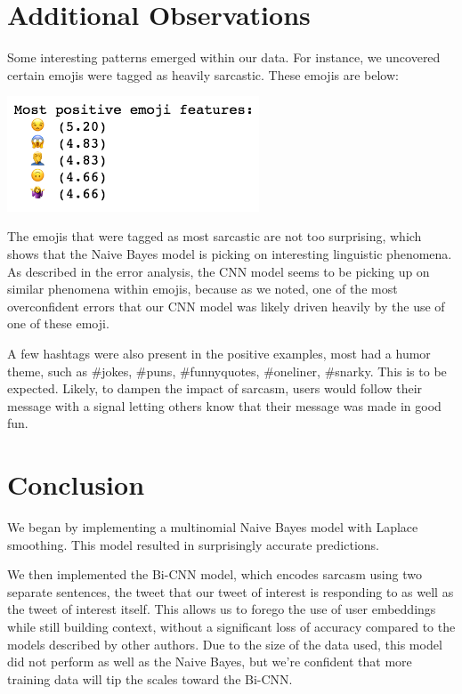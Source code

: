 \documentclass[11pt,a4paper]{article}
\begin{document}
\section{Additional Observations}

Some interesting patterns emerged within our data. For instance, we uncovered certain emojis were tagged as heavily sarcastic. These emojis are below:

\includegraphics[width=75mm,scale=0.5]{top_emoji.png}

The emojis that were tagged as most sarcastic are not too surprising, which shows that the Naive Bayes model is picking on interesting linguistic phenomena. As described in the error analysis, the CNN model seems to be picking up on similar phenomena within emojis, because as we noted, one of the most overconfident errors that our CNN model was likely driven heavily by the use of one of these emoji.

A few hashtags were also present in the positive examples, most had a humor theme, such as \#jokes, \#puns, \#funnyquotes, \#oneliner, \#snarky. This is to be expected. Likely, to dampen the impact of sarcasm, users would follow their message with a signal letting others know that their message was made in good fun.

\section{Conclusion}

We began by implementing a multinomial Naive Bayes model with Laplace smoothing. This model resulted in surprisingly accurate predictions. 

We then implemented the  Bi-CNN model, which encodes sarcasm using two separate sentences, the tweet that our tweet of interest is responding to as well as the tweet of interest itself. This allows us to forego the use of user embeddings while still building context, without a significant loss of accuracy compared to the models described by other authors. Due to the size of the data used, this model did not perform as well as the Naive Bayes, but we're confident that more training data will tip the scales toward the Bi-CNN.  
\end{document}
